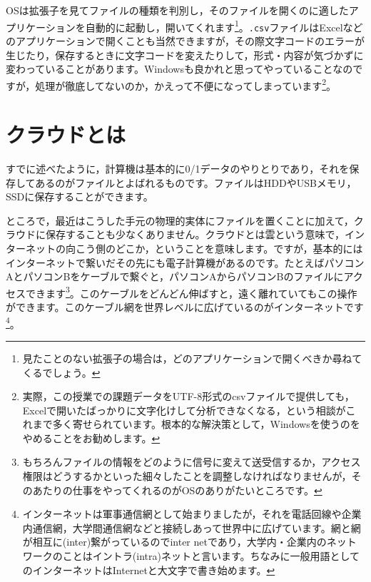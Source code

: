 \documentclass{ltjsbook}
\begin{document}
OSは拡張子を見てファイルの種類を判別し，そのファイルを開くのに適したアプリケーションを自動的に起動し，開いてくれます\footnote{見たことのない拡張子の場合は，どのアプリケーションで開くべきか尋ねてくるでしょう。}。\texttt{.csv}ファイルはExcelなどのアプリケーションで開くことも当然できますが，その際文字コードのエラーが生じたり，保存するときに文字コードを変えたりして，形式・内容が気づかずに変わっていることがあります。Windowsも良かれと思ってやっていることなのですが，処理が徹底してないのか，かえって不便になってしまっています\footnote{実際，この授業での課題データをUTF-8形式のcsvファイルで提供しても，Excelで開いたばっかりに文字化けして分析できなくなる，という相談がこれまで多く寄せられています。根本的な解決策として，Windowsを使うのをやめることをお勧めします。}。

\section{クラウドとは}
すでに述べたように，計算機は基本的に0/1データのやりとりであり，それを保存してあるのがファイルとよばれるものです。ファイルはHDDやUSBメモリ，SSDに保存することができます。

ところで，最近はこうした手元の物理的実体にファイルを置くことに加えて，クラウドに保存することも少なくありません。クラウドとは雲という意味で，インターネットの向こう側のどこか，ということを意味します。ですが，基本的にはインターネットで繋いだその先にも電子計算機があるのです。たとえばパソコンAとパソコンBをケーブルで繋ぐと，パソコンAからパソコンBのファイルにアクセスできます\footnote{もちろんファイルの情報をどのように信号に変えて送受信するか，アクセス権限はどうするかといった細々したことを調整しなければなりませんが，そのあたりの仕事をやってくれるのがOSのありがたいところです。}。このケーブルをどんどん伸ばすと，遠く離れていてもこの操作ができます。このケーブル網を世界レベルに広げているのがインターネットです\footnote{インターネットは軍事通信網として始まりましたが，それを電話回線や企業内通信網，大学間通信網などと接続しあって世界中に広げています。網と網が相互に(inter)繋がっているのでinter netであり，大学内・企業内のネットワークのことはイントラ(intra)ネットと言います。ちなみに一般用語としてのインターネットはInternetと大文字で書き始めます。}。
\end{document}
